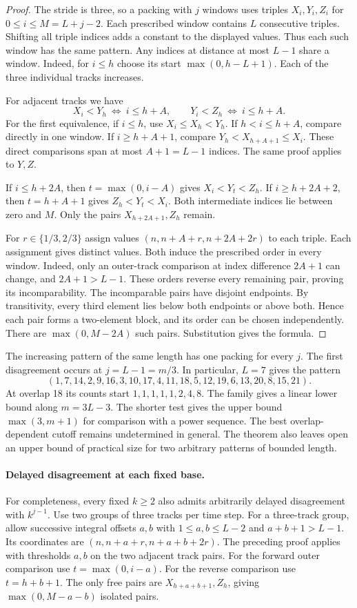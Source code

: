 \documentclass[11pt]{article}
\begin{document}
\begin{proof}
The stride is three, so a packing with $j$ windows uses triples $X_i,Y_i,Z_i$ for $0\le i\le M=L+j-2$.
Each prescribed window contains $L$ consecutive triples. Shifting all triple indices adds a constant to the displayed values.
Thus each such window has the same pattern.
Any indices at distance at most $L-1$ share a window.
Indeed, for $i\le h$ choose its start $\max(0,h-L+1)$.
Each of the three individual tracks increases.

For adjacent tracks we have
\[
 X_i<Y_h\ \Longleftrightarrow\ i\le h+A,\qquad
 Y_i<Z_h\ \Longleftrightarrow\ i\le h+A .
\]
For the first equivalence, if $i\le h$, use $X_i\le X_h<Y_h$.
If $h<i\le h+A$, compare directly in one window.
If $i\ge h+A+1$, compare $Y_h<X_{h+A+1}\le X_i$.
These direct comparisons span at most $A+1=L-1$ indices.
The same proof applies to $Y,Z$.

If $i\le h+2A$, then $t=\max(0,i-A)$ gives $X_i<Y_t<Z_h$.
If $i\ge h+2A+2$, then $t=h+A+1$ gives $Z_h<Y_t<X_i$.
Both intermediate indices lie between zero and $M$. Only the pairs $X_{h+2A+1},Z_h$ remain.

For $r\in\{1/3,2/3\}$ assign values $(n,n+A+r,n+2A+2r)$ to each triple.
Each assignment gives distinct values. Both induce the prescribed order in every window.
Indeed, only an outer-track comparison at index difference $2A+1$ can change, and $2A+1>L-1$.
These orders reverse every remaining pair, proving its incomparability.
The incomparable pairs have disjoint endpoints.
By transitivity, every third element lies below both endpoints or above both.
Hence each pair forms a two-element block, and its order can be chosen independently.
There are $\max(0,M-2A)$ such pairs. Substitution gives the formula.
\end{proof}

The increasing pattern of the same length has one packing for every $j$.
The first disagreement occurs at $j=L-1=m/3$. In particular, $L=7$ gives the pattern
\[
 (1,7,14,2,9,16,3,10,17,4,11,18,5,12,19,6,13,20,8,15,21).
\]
At overlap 18 its counts start $1,1,1,1,1,2,4,8$.
The family gives a linear lower bound along $m=3L-3$.
The shorter test gives the upper bound $\max(3,m+1)$ for comparison with a power sequence.
The best overlap-dependent cutoff remains undetermined in general.
The theorem also leaves open an upper bound of practical size for two arbitrary patterns of bounded length.

\paragraph{Delayed disagreement at each fixed base.}
For completeness, every fixed $k\ge2$ also admits arbitrarily delayed disagreement with $k^{j-1}$.
Use two groups of three tracks per time step.
For a three-track group, allow successive integral offsets $a,b$ with $1\le a,b\le L-2$ and $a+b+1>L-1$.
Its coordinates are $(n,n+a+r,n+a+b+2r)$.
The preceding proof applies with thresholds $a,b$ on the two adjacent track pairs.
For the forward outer comparison use $t=\max(0,i-a)$.
For the reverse comparison use $t=h+b+1$.
The only free pairs are $X_{h+a+b+1},Z_h$, giving $\max(0,M-a-b)$ isolated pairs.
\end{document}
